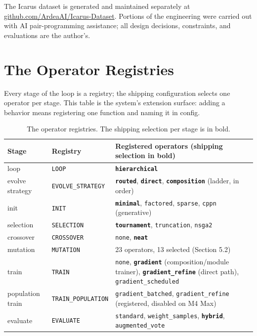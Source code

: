 \documentclass[11pt]{article}
\begin{document}
The Icarus dataset is generated and maintained separately at \url{github.com/ArdeaAI/Icarus-Dataset}. Portions of the engineering were carried out with AI pair-programming assistance; all design decisions, constraints, and evaluations are the author's.

\appendix

\section{The Operator Registries}

Every stage of the loop is a registry; the shipping configuration selects one operator per stage. This table is the system's extension surface: adding a behavior means registering one function and naming it in config.

\begin{table}[htbp]
\centering
\small
\caption{The operator registries. The shipping selection per stage is in bold.}
\label{tab:registries}
\begin{tabularx}{\textwidth}{@{}l l L@{}}
\toprule
Stage & Registry & Registered operators (shipping selection in bold) \\
\midrule
loop & \texttt{LOOP} & \textbf{\texttt{hierarchical}} \\
evolve strategy & \texttt{EVOLVE_STRATEGY} & \textbf{\texttt{routed}}, \textbf{\texttt{direct}}, \textbf{\texttt{composition}} (ladder, in order) \\
init & \texttt{INIT} & \textbf{\texttt{minimal}}, \texttt{factored}, \texttt{sparse}, \texttt{cppn} (generative) \\
selection & \texttt{SELECTION} & \textbf{\texttt{tournament}}, \texttt{truncation}, \texttt{nsga2} \\
crossover & \texttt{CROSSOVER} & \texttt{none}, \textbf{\texttt{neat}} \\
mutation & \texttt{MUTATION} & 23 operators, 13 selected (Section 5.2) \\
train & \texttt{TRAIN} & \texttt{none}, \textbf{\texttt{gradient}} (composition/module trainer), \textbf{\texttt{gradient_refine}} (direct path), \texttt{gradient_scheduled} \\
population train & \texttt{TRAIN_POPULATION} & \texttt{gradient_batched}, \texttt{gradient_refine} (registered, disabled on M4 Max) \\
evaluate & \texttt{EVALUATE} & \texttt{standard}, \texttt{weight_samples}, \textbf{\texttt{hybrid}}, \texttt{augmented_vote} \\

\end{tabularx}
\end{table}
\end{document}
